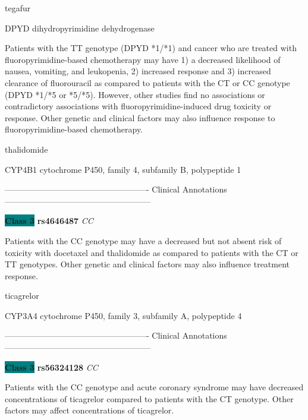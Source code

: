 \documentclass{resume} %
\begin{document}
\begin{rSection}{ tegafur }
\begin{rSubsection}{ DPYD }{ dihydropyrimidine dehydrogenase }{}{}
\item[] Patients with the TT genotype (DPYD *1/*1) and cancer who are treated with fluoropyrimidine-based chemotherapy may have 1) a decreased likelihood of nausea, vomiting, and leukopenia, 2) increased response and 3) increased clearance of fluorouracil as compared to patients with the CT or CC genotype (DPYD *1/*5 or *5/*5). However, other studies find no associations or contradictory associations with fluoropyrimidine-induced drug toxicity or response. Other genetic and clinical factors may also influence response to fluoropyrimidine-based chemotherapy.
\end{rSubsection}

\end{rSection}\begin{rSection}{ thalidomide }
\item[]

\begin{rSubsection}{ CYP4B1 }{ cytochrome P450, family 4, subfamily B, polypeptide 1 }{}{}
\item[]

\item[] ---------------------------------------------------- Clinical Annotations -----------------------------------------------------\newline
\item \textbf{\colorbox{teal} {Class 3}} \textbf{ rs4646487 } \textit{ CC }
\item[] Patients with the CC genotype may have a decreased but not absent risk of toxicity with docetaxel and thalidomide as compared to patients with the CT or TT genotypes. Other genetic and clinical factors may also influence treatment response.
\end{rSubsection}

\end{rSection}\begin{rSection}{ ticagrelor }
\item[]

\begin{rSubsection}{ CYP3A4 }{ cytochrome P450, family 3, subfamily A, polypeptide 4 }{}{}
\item[]

\item[] ---------------------------------------------------- Clinical Annotations -----------------------------------------------------\newline
\item \textbf{\colorbox{teal} {Class 3}} \textbf{ rs56324128 } \textit{ CC }
\item[] Patients with the CC genotype and acute coronary syndrome may have decreased concentrations of ticagrelor compared to patients with the CT genotype. Other factors may affect concentrations of ticagrelor.
\end{rSubsection}


\end{rSection}
\end{document}
